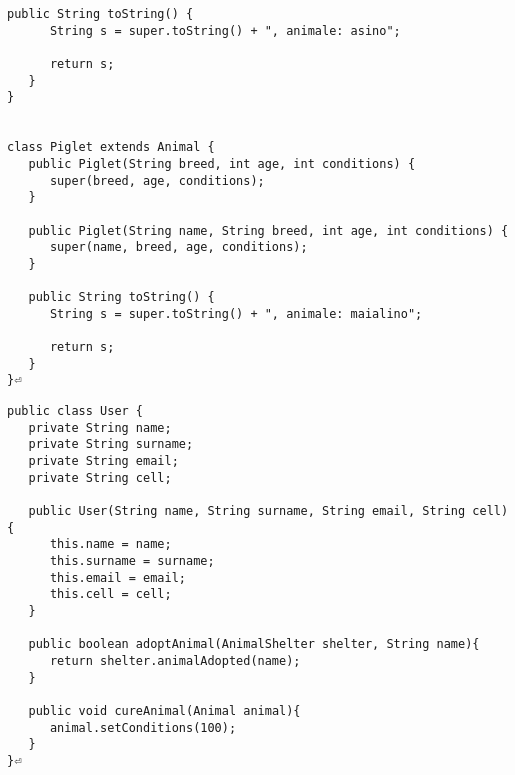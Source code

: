 \documentclass{article}
\begin{document}
\begin{lstlisting}[caption={Animal.java}]
   public String toString() {
      String s = super.toString() + ", animale: asino";

      return s;
   }
}


class Piglet extends Animal {
   public Piglet(String breed, int age, int conditions) {
      super(breed, age, conditions);
   }

   public Piglet(String name, String breed, int age, int conditions) {
      super(name, breed, age, conditions);
   }

   public String toString() {
      String s = super.toString() + ", animale: maialino";

      return s;
   }
}⏎  
	\end{lstlisting}
	
\begin{lstlisting}[caption = {User.java}]
	public class User {
   private String name;
   private String surname;
   private String email;
   private String cell;

   public User(String name, String surname, String email, String cell){
      this.name = name;
      this.surname = surname;
      this.email = email;
      this.cell = cell;
   }

   public boolean adoptAnimal(AnimalShelter shelter, String name){
      return shelter.animalAdopted(name);
   }

   public void cureAnimal(Animal animal){
      animal.setConditions(100);
   }
}⏎ 
\end{lstlisting}
\end{document}
